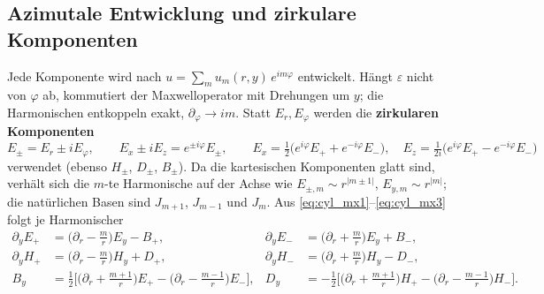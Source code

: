 \subsection{Azimutale Entwicklung und zirkulare Komponenten}
Jede Komponente wird nach $u=\sum_mu_m(r,y)\,e^{im\varphi}$ entwickelt. Hängt $\varepsilon$ nicht von $\varphi$ ab,
kommutiert der Maxwelloperator mit Drehungen um $y$; die Harmonischen entkoppeln exakt, $\partial_\varphi\to im$.
Statt $E_r,E_\varphi$ werden die \textbf{zirkularen Komponenten}
\begin{equation}
  E_\pm=E_r\pm iE_\varphi,\qquad E_x\pm iE_z=e^{\pm i\varphi}E_\pm,\qquad
  E_x=\tfrac12\big(e^{i\varphi}E_++e^{-i\varphi}E_-\big),\quad E_z=\tfrac1{2i}\big(e^{i\varphi}E_+-e^{-i\varphi}E_-\big)
  \label{eq:cyl_pm}
\end{equation}
verwendet (ebenso $H_\pm$, $D_\pm$, $B_\pm$). Da die kartesischen Komponenten glatt sind, verhält sich die
$m$-te Harmonische auf der Achse wie $E_{\pm,m}\sim r^{|m\pm1|}$, $E_{y,m}\sim r^{|m|}$; die natürlichen Basen sind
$J_{m+1}$, $J_{m-1}$ und $J_m$. Aus \eqref{eq:cyl_mx1}--\eqref{eq:cyl_mx3} folgt je Harmonischer
\begin{equation}
\begin{aligned}
  \partial_yE_+&=\big(\partial_r-\tfrac mr\big)E_y-B_+, & \partial_yE_-&=\big(\partial_r+\tfrac mr\big)E_y+B_-,\\
  \partial_yH_+&=\big(\partial_r-\tfrac mr\big)H_y+D_+, & \partial_yH_-&=\big(\partial_r+\tfrac mr\big)H_y-D_-,\\
  B_y&=\tfrac12\Big[\big(\partial_r+\tfrac{m+1}r\big)E_+-\big(\partial_r-\tfrac{m-1}r\big)E_-\Big], &
  D_y&=-\tfrac12\Big[\big(\partial_r+\tfrac{m+1}r\big)H_+-\big(\partial_r-\tfrac{m-1}r\big)H_-\Big].
\end{aligned}
\label{eq:cyl_pmeq}
\end{equation}

